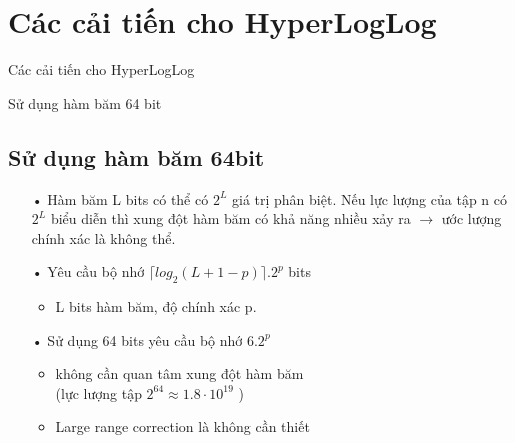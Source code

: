 \documentclass{beamer}
\begin{document}
\section{Các cải tiến cho HyperLogLog }
\begin{frame}{Các cải tiến cho HyperLogLog}

\end{frame}
\begin{frame}{Sử dụng hàm băm 64 bit}
\subsection{Sử dụng hàm băm 64bit}
\begin{itemize}
\item[•] Hàm băm L bits có thể có $2^L$ giá trị phân biệt. Nếu lực lượng của tập n có $2^L$ biểu diễn thì xung đột hàm băm có khả năng nhiều xảy ra $\rightarrow$ ước lượng chính xác là không thể.
\item[•] Yêu cầu bộ nhớ $\lceil log_2(L + 1 - p) \rceil .2^p$ bits
\begin{itemize}
\item L bits hàm băm, độ chính xác p.
\end{itemize}
\item[•] Sử dụng 64 bits yêu cầu bộ nhớ $6.2^p$
\begin{itemize}
\item không cần quan tâm xung đột hàm băm \\
(lực lượng tập $2^{64} \approx 1.8\cdot 10^{19}$ )
\item Large range correction là không cần thiết 
\end{itemize}
\end{itemize}
\end{frame}
\end{document}
